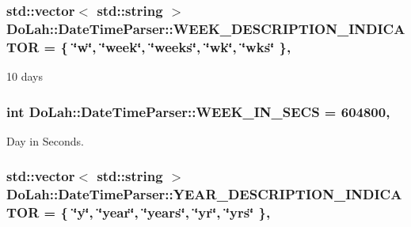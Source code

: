 \subsubsection[{W\+E\+E\+K\+\_\+\+D\+E\+S\+C\+R\+I\+P\+T\+I\+O\+N\+\_\+\+I\+N\+D\+I\+C\+A\+T\+O\+R}]{\setlength{\rightskip}{0pt plus 5cm}std\+::vector$<$ std\+::string $>$ Do\+Lah\+::\+Date\+Time\+Parser\+::\+W\+E\+E\+K\+\_\+\+D\+E\+S\+C\+R\+I\+P\+T\+I\+O\+N\+\_\+\+I\+N\+D\+I\+C\+A\+T\+O\+R = \{ \char`\"{}w\char`\"{}, \char`\"{}week\char`\"{}, \char`\"{}weeks\char`\"{}, \char`\"{}wk\char`\"{}, \char`\"{}wks\char`\"{} \}\hspace{0.3cm}{\ttfamily [static]}, {\ttfamily [private]}}\label{class_do_lah_1_1_date_time_parser_a622cd79bd79480fd69ad6161ccae07dc}


10 days 

\hypertarget{class_do_lah_1_1_date_time_parser_a6e930ec6feb5cbfe0d3429bb20142d3c}{}
\subsubsection[{W\+E\+E\+K\+\_\+\+I\+N\+\_\+\+S\+E\+C\+S}]{\setlength{\rightskip}{0pt plus 5cm}int Do\+Lah\+::\+Date\+Time\+Parser\+::\+W\+E\+E\+K\+\_\+\+I\+N\+\_\+\+S\+E\+C\+S = 604800\hspace{0.3cm}{\ttfamily [static]}, {\ttfamily [private]}}\label{class_do_lah_1_1_date_time_parser_a6e930ec6feb5cbfe0d3429bb20142d3c}


Day in Seconds. 

\hypertarget{class_do_lah_1_1_date_time_parser_af2324a9dc5ed95d1d31d584bbb1e869c}{}
\subsubsection[{Y\+E\+A\+R\+\_\+\+D\+E\+S\+C\+R\+I\+P\+T\+I\+O\+N\+\_\+\+I\+N\+D\+I\+C\+A\+T\+O\+R}]{\setlength{\rightskip}{0pt plus 5cm}std\+::vector$<$ std\+::string $>$ Do\+Lah\+::\+Date\+Time\+Parser\+::\+Y\+E\+A\+R\+\_\+\+D\+E\+S\+C\+R\+I\+P\+T\+I\+O\+N\+\_\+\+I\+N\+D\+I\+C\+A\+T\+O\+R = \{ \char`\"{}y\char`\"{}, \char`\"{}year\char`\"{}, \char`\"{}years\char`\"{}, \char`\"{}yr\char`\"{}, \char`\"{}yrs\char`\"{} \}\hspace{0.3cm}{\ttfamily [static]}, {\ttfamily [private]}}\label{class_do_lah_1_1_date_time_parser_af2324a9dc5ed95d1d31d584bbb1e869c}


